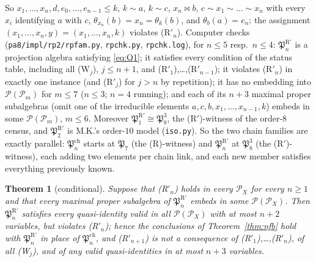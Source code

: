 \documentclass[11pt]{amsart}
\newtheorem{theorem}{Theorem}[section]
\theoremstyle{definition}
\renewcommand{\P}{\mathcal{P}}
\newcommand{\mt}{\bowtie}   %
\begin{document}
So $x_1,\dots,x_n,d,e_0,\dots,e_{n-1}\le k$, $k\sim a$, $k\sim c$, $x_n\mt b$, $c\sim x_1\sim\dots\sim x_n$ with every $x_i$ identifying $a$ with $c$, $\theta_{x_n}(b)=x_n=\theta_k(b)$, and $\theta_b(a)=e_n$: the assignment $(x_1,\dots,x_n,y)=(x_1,\dots,x_n,k)$ violates (R$'_n$). Computer checks (\texttt{pa8/impl/rp2/rpfam.py}, \texttt{rpchk.py}, \texttt{rpchk.log}), for $n\le5$ resp.\ $n\le4$: $\mathfrak P^{\mathrm R'}_n$ is a projection algebra satisfying \eqref{eq:Q1}; it satisfies every condition of the status table, including all (W$_j$), $j\le n+1$, and (R$'_1$),\dots,(R$'_{n-1}$); it violates (R$'_n$) in exactly one instance (and (R$'_j$) for $j>n$ by repetition); it has no embedding into $\P(\P_m)$ for $m\le7$ ($n\le3$; $n=4$ running); and each of its $n+3$ maximal proper subalgebras (omit one of the irreducible elements $a,c,b,x_1,\dots,x_{n-1},k$) embeds in some $\P(\P_m)$, $m\le6$. Moreover $\mathfrak P^{\mathrm R'}_1\cong\mathfrak P_8^3$, the (R$'$)-witness of the order-$8$ census, and $\mathfrak P^{\mathrm R'}_2$ is M.K.'s order-$10$ model (\texttt{iso.py}). So the two chain families are exactly parallel: $\mathfrak P^{\mathrm{ch}}_n$ starts at $\mathfrak P_7$ (the (R)-witness) and $\mathfrak P^{\mathrm R'}_n$ at $\mathfrak P_8^3$ (the (R$'$)-witness), each adding two elements per chain link, and each new member satisfies everything previously known.

\begin{theorem}[conditional]\label{thm:nfb2}
Suppose that \textup{(R$'_n$)} holds in every $\P_X$ for every $n\ge1$ and that every maximal proper subalgebra of $\mathfrak P^{\mathrm R'}_n$ embeds in some $\P(\P_X)$. Then $\mathfrak P^{\mathrm R'}_n$ satisfies every quasi-identity valid in all $\P(\P_X)$ with at most $n+2$ variables, but violates \textup{(R$'_n$)}; hence the conclusions of Theorem~\ref{thm:nfb} hold with $\mathfrak P^{\mathrm R'}_n$ in place of $\mathfrak P^{\mathrm{ch}}_n$, and \textup{(R$'_{n+1}$)} is not a consequence of \textup{(R$'_1$)},\dots,\textup{(R$'_n$)}, of all \textup{(W$_j$)}, and of any valid quasi-identities in at most $n+3$ variables.
\end{theorem}
\end{document}
